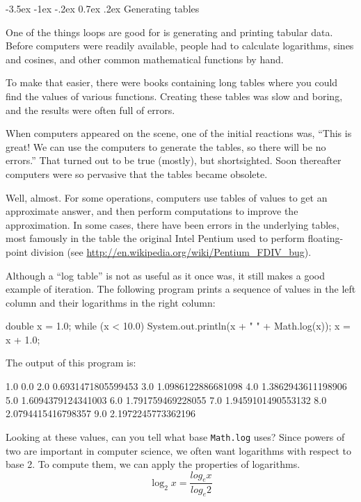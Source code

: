 \documentclass[12pt]{book}
\makeatletter
\renewcommand{\section}{\@startsection {section}{1}{\z@}%
    {-3.5ex \@plus -1ex \@minus -.2ex}%
    {0.7ex \@plus.2ex}%
    {\normalfont\Large\bfseries}}
\theoremstyle{exercise}
\makeatother
\begin{document}
\section{Generating tables}


One of the things loops are good for is generating and printing tabular data.
Before computers were readily available, people had to calculate logarithms, sines and cosines, and other common mathematical functions by hand.

To make that easier, there were books containing long tables where you could find the values of various functions.
Creating these tables was slow and boring, and the results were often full of errors.

When computers appeared on the scene, one of the initial reactions was, ``This is great!
We can use the computers to generate the tables, so there will be no errors.''
That turned out to be true (mostly), but shortsighted.
Soon thereafter computers were so pervasive that the tables became obsolete.


Well, almost.
For some operations, computers use tables of values to get an approximate answer, and then perform computations to improve
the approximation.
In some cases, there have been errors in the underlying tables, most famously in the table the original Intel Pentium used to perform floating-point division (see \url{http://en.wikipedia.org/wiki/Pentium_FDIV_bug}).

Although a ``log table'' is not as useful as it once was, it still makes a good example of iteration.
The following program prints a sequence of values in the left column and their logarithms in the right column:

\begin{code}
    double x = 1.0;
    while (x < 10.0) {
        System.out.println(x + "   " + Math.log(x));
        x = x + 1.0;
    }
\end{code}

The output of this program is:

\begin{stdout}
1.0   0.0
2.0   0.6931471805599453
3.0   1.0986122886681098
4.0   1.3862943611198906
5.0   1.6094379124341003
6.0   1.791759469228055
7.0   1.9459101490553132
8.0   2.0794415416798357
9.0   2.1972245773362196
\end{stdout}

Looking at these values, can you tell what base {\tt Math.log} uses?
Since powers of two are important in computer science, we often want logarithms with respect to base 2.
To compute them, we can apply the properties of logarithms.
%
\begin{equation*}
\log_2 x = \frac{log_e x}{log_e 2}
\end{equation*}
\end{document}
